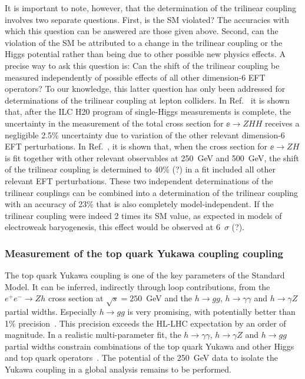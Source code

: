 It is important to note, however, that the determination of the
trilinear coupling involves two separate questions.  First, is the SM
violated?   The accuracies with which this question can be answered
are those given above.  Second, can the violation of the SM be
attributed to a change in the trilinear coupling or the Higgs
potential rather than being due to other possible new physics
effects.  A precise way to ask this question is: Can the shift of the
trilinear coupling be measured  independently of possible effects of
all 
other dimension-6 EFT operators?   To our knowledge, this latter
question has only been addressed for determinations of the trilinear
coupling at lepton colliders.   In Ref.~\cite{Barklow:2017awn} it is
shown that, after the ILC H20 program of single-Higgs measurements is
complete, the uncertainty in the measurement of the total cross
section for  $\ee\to ZHH$ receives a negligible 2.5\% uncertainty due
to variation of the other relevant dimension-6 EFT perturbations.   In
Ref.~\cite{DiVita:2017vrr}, it is shown that, when the cross section
for $\ee\to ZH$ is fit together with other relevant observables at
250~GeV and 500~GeV, the shift of the trilinear coupling is determined
to 40\% (?)
in a fit included all other relevant EFT perturbations.   These two
independent determinations of the trilinear couplings can be combined
into a determination of the trilinear coupling  with an accuracy of 23\% that is
also completely model-independent.   If the trilinear coupling were
indeed 2 times its SM value, as expected in models of electroweak
baryogenesis, this effect would be observed at 6~$\sigma$ (?).


\subsubsection{Measurement of the top quark Yukawa coupling coupling}
\label{subsubsec:highE:topYukawa}

The top quark Yukawa coupling is one of the key parameters of the Standard Model. 
It can be inferred, indirectly through loop contributions, from the $e^+e^- \rightarrow Zh$
cross section at $\sqrt{s}=  250$~GeV  and the $h \rightarrow gg$, $h \rightarrow \gamma \gamma$
and $h \rightarrow \gamma Z$ partial widths. Especially $h \rightarrow gg$ is very promising, with potentially
better than 1\% precision~\cite{Boselli:2018zxr}. This precision exceeds the HL-LHC expectation by an order of magnitude.
In a realistic multi-parameter fit, the $h \rightarrow \gamma \gamma$, $h \rightarrow \gamma Z$ and $h \rightarrow gg$
partial widths constrain combinations of the top quark Yukawa and other Higgs~\cite{Azatov:2016xik} and top quark
operators~\cite{Vryonidou:2018eyv}. The potential of the 250~GeV data to isolate the Yukawa
coupling in a global analysis remains to be performed.

